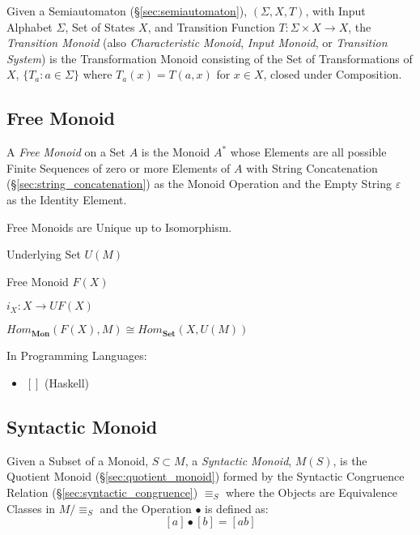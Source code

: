 Given a Semiautomaton (\S\ref{sec:semiautomaton}), $(\Sigma, X, T)$,
with Input Alphabet $\Sigma$, Set of States $X$, and Transition
Function $T : \Sigma \times X \rightarrow X$, the \emph{Transition
  Monoid} (also \emph{Characteristic Monoid}, \emph{Input Monoid}, or
\emph{Transition System}) is the Transformation Monoid consisting of
the Set of Transformations of $X$, $\{T_a : a \in \Sigma\}$ where
$T_a(x) = T(a,x)$ for $x \in X$, closed under Composition.



\subsection{Free Monoid}\label{sec:free_monoid}

A \emph{Free Monoid} on a Set $A$ is the Monoid $A^*$ whose Elements
are all possible Finite Sequences of zero or more Elements of $A$ with
String Concatenation (\S\ref{sec:string_concatenation}) as the Monoid
Operation and the Empty String $\varepsilon$ as the Identity Element.

Free Monoids are Unique up to Isomorphism.

Underlying Set $U(M)$

Free Monoid $F(X)$

$i_X : X \rightarrow U F (X)$

$Hom_\mathbf{Mon}(F(X), M) \cong Hom_\mathbf{Set}(X, U(M))$

In Programming Languages:

\begin{itemize}
  \item $\mathtt{[]}$ (Haskell)
\end{itemize}



\subsection{Syntactic Monoid}\label{sec:syntactic_monoid}

Given a Subset of a Monoid, $S \subset M$, a \emph{Syntactic Monoid},
$M(S)$, is the Quotient Monoid (\S\ref{sec:quotient_monoid}) formed by
the Syntactic Congruence Relation (\S\ref{sec:syntactic_congruence})
$\equiv_S$ where the Objects are Equivalence Classes in $M / \equiv_S$
and the Operation $\bullet$ is defined as:
\[
  [a] \bullet [b] = [ab]
\]

